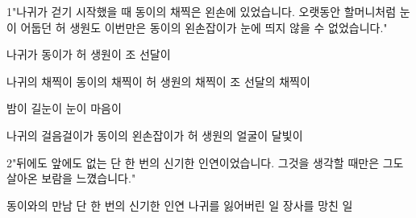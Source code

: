 \documentclass[fs85,seriesRus]{korfarm-base}
\begin{document}
\kfActivityBg \par{}
\par{}\par\nopagebreak[4]\smallskip\nopagebreak[4]
\kfBeginMC
\begin{kfSentenceUnit}{1}{"나귀가 걷기 시작했을 때 동이의 채찍은 왼손에 있었습니다. 오랫동안 할머니처럼 눈이 어둡던 허 생원도 이번만은 동이의 왼손잡이가 눈에 띄지 않을 수 없었습니다."}
\begin{kfChoices}
\kfChoice 나귀가
\kfChoice 동이가
\kfChoice 허 생원이
\kfChoice 조 선달이
\end{kfChoices}
\begin{kfChoices}
\kfChoice 나귀의 채찍이
\kfChoice 동이의 채찍이
\kfChoice 허 생원의 채찍이
\kfChoice 조 선달의 채찍이
\end{kfChoices}
\begin{kfChoices}
\kfChoice 밤이
\kfChoice 길눈이
\kfChoice 눈이
\kfChoice 마음이
\end{kfChoices}
\begin{kfChoices}
\kfChoice 나귀의 걸음걸이가
\kfChoice 동이의 왼손잡이가
\kfChoice 허 생원의 얼굴이
\kfChoice 달빛이
\end{kfChoices}
\end{kfSentenceUnit}

\begin{kfSentenceUnit}{2}{"뒤에도 앞에도 없는 단 한 번의 신기한 인연이었습니다. 그것을 생각할 때만은 그도 살아온 보람을 느꼈습니다."}
\begin{kfChoices}
\kfChoice 동이와의 만남
\kfChoice 단 한 번의 신기한 인연
\kfChoice 나귀를 잃어버린 일
\kfChoice 장사를 망친 일
\end{kfChoices}
\end{kfSentenceUnit}

\kfEndMC
\end{document}
